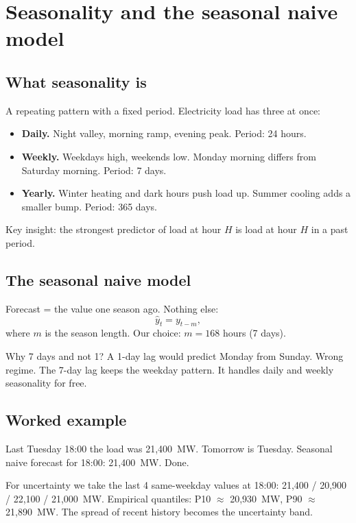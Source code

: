 \section{Seasonality and the seasonal naive model}

\subsection{What seasonality is}

A repeating pattern with a fixed period. Electricity load has three at once:

\begin{itemize}
  \item \textbf{Daily.} Night valley, morning ramp, evening peak. Period: 24 hours.
  \item \textbf{Weekly.} Weekdays high, weekends low. Monday morning differs from
        Saturday morning. Period: 7 days.
  \item \textbf{Yearly.} Winter heating and dark hours push load up. Summer cooling
        adds a smaller bump. Period: 365 days.
\end{itemize}

Key insight: the strongest predictor of load at hour $H$ is load at hour $H$ in a
past period.

\subsection{The seasonal naive model}

Forecast = the value one season ago. Nothing else:
\begin{equation}
  \hat{y}_{t} = y_{t - m},
\end{equation}
where $m$ is the season length. Our choice: $m = 168$ hours (7 days).

Why 7 days and not 1? A 1-day lag would predict Monday from Sunday. Wrong regime.
The 7-day lag keeps the weekday pattern. It handles daily and weekly seasonality
for free.

\subsection{Worked example}

Last Tuesday 18:00 the load was 21{,}400~MW. Tomorrow is Tuesday.
Seasonal naive forecast for 18:00: 21{,}400~MW. Done.

For uncertainty we take the last 4 same-weekday values at 18:00:
21{,}400 / 20{,}900 / 22{,}100 / 21{,}000~MW.
Empirical quantiles: P10 $\approx$ 20{,}930~MW, P90 $\approx$ 21{,}890~MW.
The spread of recent history becomes the uncertainty band.

